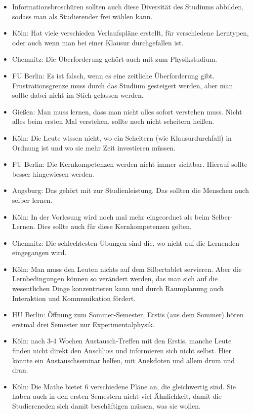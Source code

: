 \begin{itemize}
      \item Informationsbroschüren sollten auch diese Diversität des Studiums abbilden, sodass man als Studierender frei wählen kann.
      \item Köln: Hat viele verschieden Verlaufspläne erstellt, für verschiedene Lerntypen, oder auch wenn man bei einer Klausur durchgefallen ist.
      \item Chemnitz: Die Überforderung gehört auch mit zum Physikstudium.
      \item FU Berlin: Es ist falsch, wenn es eine zeitliche Überforderung gibt. Frustrationsgrenze muss durch das Studium gesteigert werden, aber man sollte dabei nicht im Stich gelassen werden.
      \item Gießen: Man muss lernen, dass man nicht alles sofort verstehen muss. Nicht alles beim ersten Mal verstehen, sollte noch nicht scheitern heißen.
      \item Köln: Die Leute wissen nicht, wo ein Scheitern (wie Klausurdurchfall) in Ordnung ist und wo sie mehr Zeit investieren müssen.
      \item FU Berlin: Die Kernkompetenzen werden nicht immer sichtbar. Hierauf sollte besser hingewiesen werden.
      \item Augsburg: Das gehört mit zur Studienleistung. Das sollten die Menschen auch selber lernen.
      \item Köln: In der Vorlesung wird noch mal mehr eingeordnet als beim Selber-Lernen. Dies sollte auch für diese Kernkompetenzen gelten.
      \item Chemnitz: Die schlechtesten Übungen sind die, wo nicht auf die Lernenden eingegangen wird.
      \item Köln: Man muss den Leuten nichts auf dem Silbertablet servieren. Aber die Lernbedingungen können so verändert werden, das man sich auf die wesentlichen Dinge konzentrieren kann und durch Raumplanung auch Interaktion und Kommunikation fördert.
      \item HU Berlin: Öffnung zum Sommer-Semester, Erstis (aus dem Sommer) hören erstmal drei Semester nur Experimentalphysik.
      \item Köln: nach 3-4 Wochen Austausch-Treffen mit den Erstis, manche Leute finden nicht direkt den Anschluss und informieren sich nicht selbst. Hier könnte ein Austauschseminar helfen, mit Anekdoten und allem drum und dran.
      \item Köln: Die Mathe bietet 6 verschiedene Pläne an, die gleichwertig sind. Sie haben auch in den ersten Semestern nicht viel Ähnlichkeit, damit die Studiereneden sich damit beschäftigen müssen, was sie wollen.

\end{itemize}
